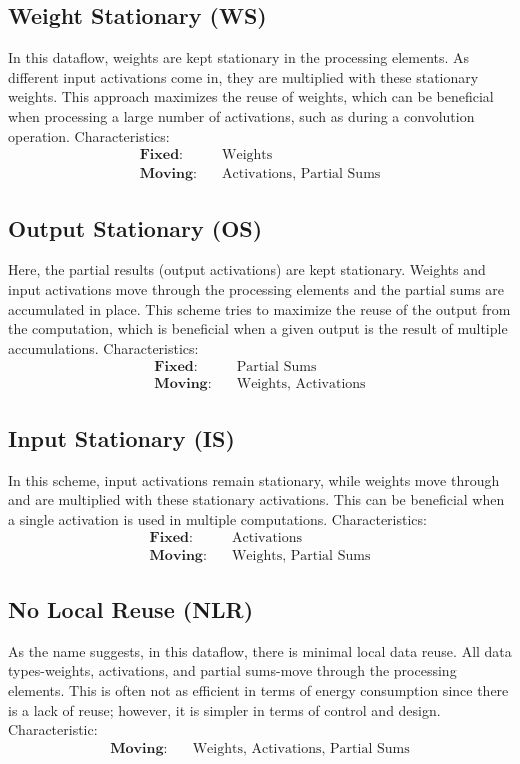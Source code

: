 \subsection*{Weight Stationary (WS)}
In this dataflow, weights are kept stationary in the processing elements. As different input activations come in, they are multiplied with these stationary weights. This approach maximizes the reuse of weights, which can be beneficial when processing a large number of activations, such as during a convolution operation.
Characteristics:
\begin{align*}
\textbf{Fixed:} & \quad \text{Weights} \\
\textbf{Moving:} & \quad \text{Activations, Partial Sums}
\end{align*}

\subsection*{Output Stationary (OS)}
Here, the partial results (output activations) are kept stationary. Weights and input activations move through the processing elements and the partial sums are accumulated in place. This scheme tries to maximize the reuse of the output from the computation, which is beneficial when a given output is the result of multiple accumulations. Characteristics:
\begin{align*}
\textbf{Fixed:} & \quad \text{Partial Sums} \\
\textbf{Moving:} & \quad \text{Weights, Activations}
\end{align*}

\subsection*{Input Stationary (IS)}
In this scheme, input activations remain stationary, while weights move through and are multiplied with these stationary activations. This can be beneficial when a single activation is used in multiple computations. Characteristics:
\begin{align*}
\textbf{Fixed:} & \quad \text{Activations} \\
\textbf{Moving:} & \quad \text{Weights, Partial Sums}
\end{align*}

\subsection*{No Local Reuse (NLR)}
As the name suggests, in this dataflow, there is minimal local data reuse. All data types-weights, activations, and partial sums-move through the processing elements. This is often not as efficient in terms of energy consumption since there is a lack of reuse; however, it is simpler in terms of control and design. Characteristic:
\begin{align*}
\textbf{Moving:} & \quad \text{Weights, Activations, Partial Sums}
\end{align*}

